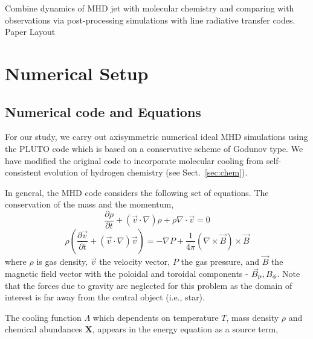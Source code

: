 \documentclass[useAMS,usenatbib,letters]{mn2e}
\begin{document}
Combine dynamics of MHD jet with molecular chemistry and comparing
with observations via post-processing simulations with line radiative
transfer codes. \\

Paper Layout \\

\section{Numerical Setup}
\subsection{Numerical code and Equations}
For our study, we carry out axisymmetric numerical ideal MHD simulations using the PLUTO code \citep{Mignone:2007p644} which is based on a conservative scheme of Godunov type.
We have modified the original code to incorporate molecular cooling
from self-consistent evolution of hydrogen chemistry (see Sect.~\ref{sec:chem}).

  
In general, the MHD code considers the following set of equations.
The conservation of the mass and the momentum,
%
\begin{equation}\label{masscons}
\frac{\partial \rho}{\partial t} + (\vec{v} \cdot \nabla)\rho  +
\rho \nabla \cdot \vec{v} = 0
\end{equation}
%
\begin{equation}\label{momcons}
\rho(\frac{\partial \vec{v}}{\partial t} +
(\vec{v} \cdot \nabla) \vec{v}) =
- \nabla P + \frac{1}{4\pi} (\nabla \times \vec{B}) \times \vec{B}
\end{equation}
%
where $\rho$ is gas density, $\vec{v}$ the velocity vector, $P$ the gas pressure,
and $\vec{B}$ the magnetic field vector with the poloidal and toroidal
components - $\vec{B}_{\rm p}, {B}_{\phi}$. Note that the forces due
to gravity are neglected for this problem as the domain of interest is
far away from the central object (i.e., star).  
%

The cooling function $\Lambda$ which dependents on temperature $T$, mass density $\rho$ and
chemical abundances {\bf{X}}, appears in the
energy equation as a source term,
\end{document}
